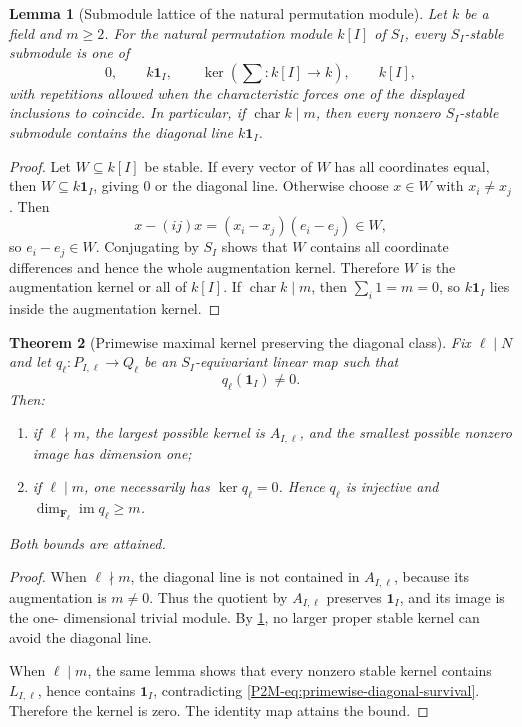 \documentclass[11pt]{article}
\newtheorem{theorem}{Theorem}[section]
\newtheorem{lemma}[theorem]{Lemma}
\theoremstyle{remark}
\begin{document}
\begin{lemma}[Submodule lattice of the natural permutation module]
\label{P2M-lem:permutation-submodule-lattice}
Let \(k\) be a field and \(m\ge2\).  For the natural permutation module
\(k[I]\) of \(S_I\), every \(S_I\)-stable submodule is one of
\[
 0,\qquad k\mathbf1_I,\qquad
 \ker\!\left(\sum:k[I]\to k\right),\qquad k[I],
\]
with repetitions allowed when the characteristic forces one of the displayed
inclusions to coincide.  In particular, if \(\operatorname{char}k\mid m\),
then every nonzero \(S_I\)-stable submodule contains the diagonal line
\(k\mathbf1_I\).
\end{lemma}

\begin{proof}
Let \(W\subseteq k[I]\) be stable.  If every vector of \(W\) has all
coordinates equal, then \(W\subseteq k\mathbf1_I\), giving \(0\) or the
diagonal line.  Otherwise choose \(x\in W\) with \(x_i\ne x_j\).  Then
\[
 x-(ij)x=(x_i-x_j)(e_i-e_j)\in W,
\]
so \(e_i-e_j\in W\).  Conjugating by \(S_I\) shows that \(W\) contains all
coordinate differences and hence the whole augmentation kernel.  Therefore
\(W\) is the augmentation kernel or all of \(k[I]\).  If
\(\operatorname{char}k\mid m\), then
\(\sum_i1=m=0\), so \(k\mathbf1_I\) lies inside the augmentation kernel.
\end{proof}

\begin{theorem}[Primewise maximal kernel preserving the diagonal class]
\label{P2M-thm:primewise-maximal-kernel}
Fix \(\ell\mid N\) and let
\(q_\ell:P_{I,\ell}\to Q_\ell\) be an \(S_I\)-equivariant linear map such
that
\begin{equation}\label{P2M-eq:primewise-diagonal-survival}
 q_\ell(\mathbf1_I)\ne0.
\end{equation}
Then:
\begin{enumerate}[label=\textup{(\roman*)}]
\item if \(\ell\nmid m\), the largest possible kernel is
      \(A_{I,\ell}\), and the smallest possible nonzero image has dimension
      one;
\item if \(\ell\mid m\), one necessarily has \(\ker q_\ell=0\).  Hence
      \(q_\ell\) is injective and
      \(\dim_{\mathbf F_\ell}\operatorname{im}q_\ell\ge m\).
\end{enumerate}
Both bounds are attained.
\end{theorem}

\begin{proof}
When \(\ell\nmid m\), the diagonal line is not contained in
\(A_{I,\ell}\), because its augmentation is \(m\ne0\).  Thus the quotient
by \(A_{I,\ell}\) preserves \(\mathbf1_I\), and its image is the one-
dimensional trivial module.  By
\cref{P2M-lem:permutation-submodule-lattice}, no larger proper stable kernel can
avoid the diagonal line.

When \(\ell\mid m\), the same lemma shows that every nonzero stable kernel
contains \(L_{I,\ell}\), hence contains \(\mathbf1_I\), contradicting
\eqref{P2M-eq:primewise-diagonal-survival}.  Therefore the kernel is zero.  The
identity map attains the bound.
\end{proof}
\end{document}
